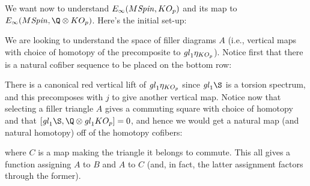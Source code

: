 We want now to understand $E_\infty(M\mathit{Spin}, KO_p)$ and its map to $E_\infty(M\Spin, \Q \otimes KO_p)$.  Here's the initial set-up:
\begin{center}
\end{center}
We are looking to understand the space of filler diagrams $A$ (i.e., vertical maps with choice of homotopy of the precomposite to $\mathit{gl}_1 \eta_{KO_p}$).  Notice first that there is a natural cofiber sequence to be placed on the bottom row:
\begin{center}
\end{center}
There is a canonical red vertical lift of $\mathit{gl}_1 \eta_{KO_p}$ since $\gl_1 \S$ is a torsion spectrum, and this precomposes with $j$ to give another vertical map.  Notice now that selecting a filler triangle $A$ gives a commuting square with choice of homotopy and that $[\gl_1 \S, \Q \otimes \gl_1 KO_p] = 0$, and hence we would get a natural map (and natural homotopy) off of the homotopy cofibers:
\begin{center}
\end{center}
where $C$ is a map making the triangle it belongs to commute.  This all gives a function assigning $A$ to $B$ and $A$ to $C$ (and, in fact, the latter assignment factors through the former).

